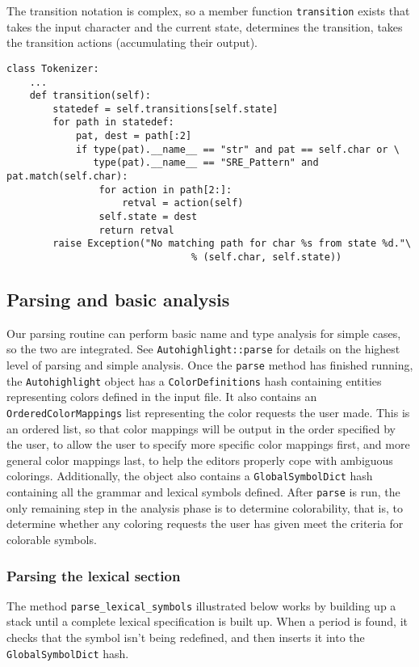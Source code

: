 \documentclass[]{article}
\begin{document}
  The transition notation is complex, so a member function
  \verb+transition+ exists that takes the input character and the
  current state, determines the transition, takes the transition
  actions (accumulating their output). 
  \begin{lstlisting}
class Tokenizer:
    ...
    def transition(self):
        statedef = self.transitions[self.state]
        for path in statedef:
            pat, dest = path[:2]
            if type(pat).__name__ == "str" and pat == self.char or \
               type(pat).__name__ == "SRE_Pattern" and pat.match(self.char):
                for action in path[2:]:
                    retval = action(self)
                self.state = dest
                return retval
        raise Exception("No matching path for char %s from state %d."\
                                % (self.char, self.state))
  \end{lstlisting}

  \subsection{Parsing and basic analysis}
  Our parsing routine can perform basic name and type analysis for simple
  cases, so the two are integrated. See \verb+Autohighlight::parse+ for details
  on the highest level of parsing and simple analysis. Once the \verb+parse+
  method has finished running, the \verb+Autohighlight+ object has a
  \verb+ColorDefinitions+ hash containing entities representing colors defined
  in the input file. It also contains an \verb+OrderedColorMappings+ list
  representing the color requests the user made.  This is an ordered list, so
  that color mappings will be output in the order specified by the user, to
  allow the user to specify more specific color mappings first, and more
  general color mappings last, to help the editors properly cope with ambiguous
  colorings. Additionally, the object also contains a \verb+GlobalSymbolDict+
  hash containing all the grammar and lexical symbols defined. After
  \verb+parse+ is run, the only remaining step in the analysis phase is to
  determine colorability, that is, to determine whether any coloring requests
  the user has given meet the criteria for colorable symbols.

  \subsubsection{Parsing the lexical section}
  The method \verb+parse_lexical_symbols+ illustrated below works by
  building up a stack until a complete lexical specification is built
  up. When a period is found, it checks that the symbol isn't being
  redefined, and then inserts it into the \verb+GlobalSymbolDict+
  hash. 
\end{document}
